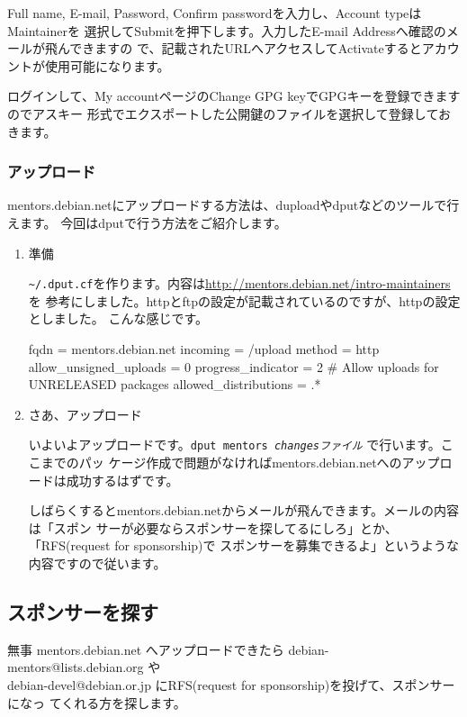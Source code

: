 \documentclass[mingoth,a4paper]{jsarticle}
\begin{document}
Full name, E-mail, Password, Confirm passwordを入力し、Account typeはMaintainerを
選択してSubmitを押下します。入力したE-mail Addressへ確認のメールが飛んできますの
で、記載されたURLへアクセスしてActivateするとアカウントが使用可能になります。

ログインして、My accountページのChange GPG keyでGPGキーを登録できますのでアスキー
形式でエクスポートした公開鍵のファイルを選択して登録しておきます。

\subsubsection{アップロード}
mentors.debian.netにアップロードする方法は、duploadやdputなどのツールで行えます。
今回はdputで行う方法をご紹介します。

\begin{enumerate}
\item 準備

\texttt{\~{}/.dput.cf}を作ります。内容は\url{http://mentors.debian.net/intro-maintainers}を
参考にしました。httpとftpの設定が記載されているのですが、httpの設定としました。
こんな感じです。

\begin{commandline}
[mentors]
fqdn = mentors.debian.net
incoming = /upload
method = http
allow_unsigned_uploads = 0
progress_indicator = 2
# Allow uploads for UNRELEASED packages
allowed_distributions = .*
\end{commandline}

\item さあ、アップロード

いよいよアップロードです。\texttt{dput mentors \textit{changesファイル}} で行います。ここまでのパッ
ケージ作成で問題がなければmentors.debian.netへのアップロードは成功するはずです。

しばらくするとmentors.debian.netからメールが飛んできます。メールの内容は「スポン
サーが必要ならスポンサーを探してるにしろ」とか、「RFS(request for sponsorship)で
スポンサーを募集できるよ」というような内容ですので従います。
\end{enumerate}

\subsection{スポンサーを探す}
無事 mentors.debian.net へアップロードできたら debian-mentors@lists.debian.org や\\
debian-devel@debian.or.jp にRFS(request for sponsorship)を投げて、スポンサーになっ
てくれる方を探します。
\end{document}
